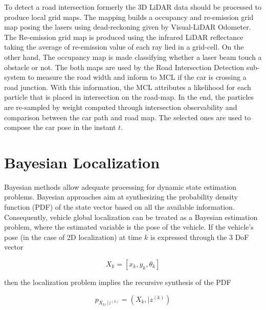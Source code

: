 To detect a road intersection formerly the 3D LiDAR data should be processed to produce local grid maps. The mapping builds a occupancy and re-emission grid map posing the lasers using dead-reckoning given by Visual-LiDAR Odometer. The Re-emission grid map is produced using the infrared LiDAR reflectance taking the average of re-emission value of each ray lied in a grid-cell. On the other hand, The occupancy map is made classifying whether a laser beam touch a obstacle or not. The both maps are used by the Road Intersection Detection sub-system to measure the road width and inform to MCL if the car is crossing a road junction. With this information, the MCL attributes a likelihood for each particle that is placed in intersection on the road-map. In the end, the particles are re-sampled by weight computed through intersection observability and comparison between the car path and road map. The selected ones are used to compose the car pose in the instant $t$.    



\section{Bayesian Localization}

Bayesian methods \cite{Arulampalam02atutorial} allow adequate processing for dynamic state estimation problems. Bayesian approaches aim at synthesizing the probability density function (PDF) of the state vector based on all the available information. Consequently, vehicle global  localization can be treated as a Bayesian estimation problem, where the estimated variable is the pose of the vehicle. If the vehicle's pose (in the case of 2D localization) at time $k$ is expressed through the 3 DoF vector 

\begin{equation}
\label{Eq::ch2-1}
X_k = [x_k, y_k, \theta_k]
\end{equation}

then the localization problem implies the recursive synthesis of the PDF

\begin{equation}
\label{Eq::ch2-2}
p_{X_k, | z^{\left( k\right)}} = \left( X_k, | z^{\left( k\right)}\right) 
\end{equation}


